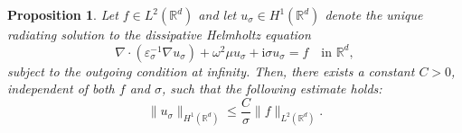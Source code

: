 \documentclass[12pt,reqno]{amsart}
\newtheorem{proposition}[theorem]{Proposition}
\numberwithin{equation}{section}
\begin{document}
\begin{proposition}\label{prop:uniform-estimate}
Let $f \in L^2(\mathbb{R}^d)$ and let $u_\sigma \in H^1(\mathbb{R}^d)$ denote the unique radiating solution to the dissipative Helmholtz equation
\begin{equation}\label{ge}
    \nabla \cdot (\varepsilon_\sigma^{-1} \nabla u_\sigma) + \omega^2 \mu u_\sigma + \mathrm{i}\sigma u_\sigma = f \quad \text{in } \mathbb{R}^d,
\end{equation}
subject to the outgoing condition at infinity. Then, there exists a constant $C > 0$, independent of both $f$ and $\sigma$, such that the following estimate holds:
\begin{equation*}
    \|u_\sigma\|_{H^1(\mathbb{R}^d)} \le \frac{C}{\sigma} \|f\|_{L^2(\mathbb{R}^d)}.
\end{equation*}
\end{proposition}
\end{document}

